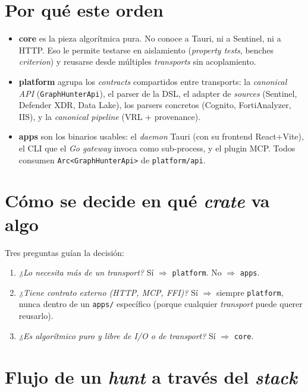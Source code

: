 \section{Por qué este orden}

\begin{itemize}
    \item \textbf{core} es la pieza algorítmica pura. No conoce a
    Tauri, ni a Sentinel, ni a HTTP. Eso le permite testarse en
    aislamiento (\emph{property tests}, benches \emph{criterion}) y
    reusarse desde múltiples \emph{transports} sin acoplamiento.
    \item \textbf{platform} agrupa los \emph{contracts} compartidos
    entre transports: la \emph{canonical API}
    (\texttt{GraphHunterApi}), el parser de la DSL, el adapter de
    \emph{sources} (Sentinel, Defender XDR, Data Lake), los parsers
    concretos (Cognito, FortiAnalyzer, IIS), y la \emph{canonical
    pipeline} (VRL + provenance).
    \item \textbf{apps} son los binarios usables: el \emph{daemon}
    Tauri (con su frontend React+Vite), el CLI que el \emph{Go
    gateway} invoca como sub-process, y el plugin MCP. Todos
    consumen \texttt{Arc<GraphHunterApi>} de \texttt{platform/api}.
\end{itemize}

\section{Cómo se decide en qué \emph{crate} va algo}

Tres preguntas guían la decisión:

\begin{enumerate}
    \item \emph{¿Lo necesita más de un transport?} Sí $\Rightarrow$
    \texttt{platform}. No $\Rightarrow$ \texttt{apps}.
    \item \emph{¿Tiene contrato externo (HTTP, MCP, FFI)?} Sí
    $\Rightarrow$ siempre \texttt{platform}, nunca dentro de un
    \texttt{apps/} específico (porque cualquier \emph{transport}
    puede querer reusarlo).
    \item \emph{¿Es algorítmico puro y libre de I/O o de
    \emph{transport}?} Sí $\Rightarrow$ \texttt{core}.
\end{enumerate}

\section{Flujo de un \emph{hunt} a través del \emph{stack}}

